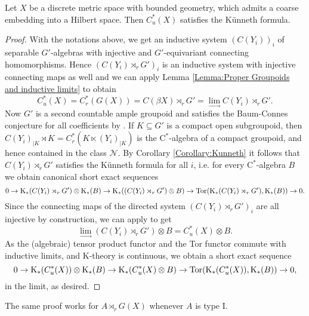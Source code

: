 \begin{satz}
		Let $X$ be a discrete metric space with bounded geometry, which admits a coarse embedding into a Hilbert space. Then $C_u^*(X)$ satisfies the Künneth formula.
	\end{satz}
	\begin{proof}
		With the notations above, we get an inductive system $(C(Y_i))_i$ of separable $G'$-algebras with injective and $G'$-equivariant connecting homomorphisms. Hence $(C(Y_i)\rtimes_r G')_i$ is an inductive system with injective connecting maps as well and we can apply Lemma \ref{Lemma:Proper Groupoids and inductive limits} to obtain
		$$C_u^*(X)=C_r^*(G(X))=C(\beta X)\rtimes_r G'=\lim\limits_{\longrightarrow} C(Y_i)\rtimes_r G'.$$
		Now $G'$ is a second countable ample groupoid and satisfies the Baum-Connes conjecture for all coefficients by \cite{Tu98}. If $K\subseteq G'$ is a compact open subgroupoid, then $C(Y_i)_{\mid K}\rtimes K=C_r^*(K\ltimes(Y_i)_{\mid K})$ is the $\mathrm{C}^*$-algebra of a compact groupoid, and hence contained in the class $\mathcal{N}$. By Corollary \ref{Corollary:Kunneth} it follows that $C(Y_i)\rtimes_r G'$ satisfies the Künneth formula for all $i$, i.e. for every $\mathrm{C}^*$-algebra $B$ we obtain canonical short exact sequences
		$$0\rightarrow \mathrm K_*(C(Y_i)\rtimes_r G')\otimes \mathrm K_*(B)\rightarrow \mathrm K_*((C(Y_i)\rtimes_r G')\otimes B)\rightarrow \mathrm{Tor}(\mathrm K_*(C(Y_i)\rtimes_r G'),\mathrm K_*(B))\rightarrow 0.$$
		Since the connecting maps of the directed system $(C(Y_i)\rtimes_r G')_i$ are all injective by construction, we can apply \cite[II.9.6.6]{MR2188261} to get $$\lim\limits_{\longrightarrow}(C(Y_i)\rtimes_r G')\otimes B=C_u^*(X)\otimes B.$$
		As the (algebraic) tensor product functor and the Tor functor commute with inductive limits, and $\mathrm{K}$-theory is continuous, we obtain a short exact sequence
		$$0\rightarrow \mathrm K_*(C_u^*(X))\otimes \mathrm K_*(B)\rightarrow \mathrm K_*(C_u^*(X)\otimes B)\rightarrow \mathrm{Tor}(\mathrm K_*(C_u^*(X)),\mathrm K_*(B))\rightarrow 0,$$
		in the limit, as desired.
	\end{proof}
	The same proof works for $A\rtimes_r G(X)$ whenever $A$ is type I.

